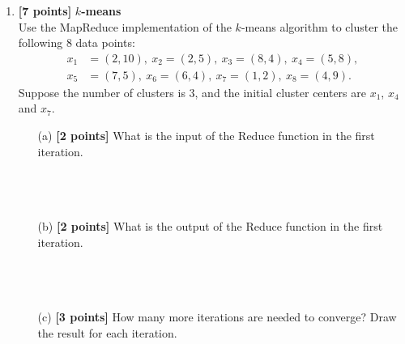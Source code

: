 \documentclass[10pt]{article}
\begin{document}
\begin{enumerate}
    \item \textbf{[7 points]} \textbf{$k$-means} \\
          Use the MapReduce implementation of the $k$-means algorithm to cluster the following 8 data points:
          \begin{align*}
              x_1 & = (2,10), \ x_2 = (2,5), \ x_3 = (8,4), \ x_4 = (5,8), \\
              x_5 & = (7,5),  \ x_6 = (6,4), \ x_7 = (1,2), \ x_8 = (4,9).
          \end{align*}
          Suppose the number of clusters is 3, and the initial cluster centers are $x_1$, $x_4$ and $x_7$.
          \begin{itemize}
              \item[(a)] \textbf{[2 points]} What is the input of the Reduce function in the first iteration. \\ \\ \\ \\
              \item[(b)] \textbf{[2 points]} What is the output of the Reduce function in the first iteration. \\ \\ \\ \\
              \item[(c)] \textbf{[3 points]} How many more iterations are needed to converge? Draw the result for each iteration. \\ \\ \\ \\
          \end{itemize}

\end{enumerate}
\end{document}
